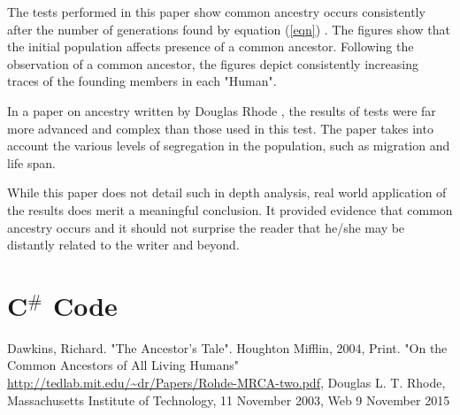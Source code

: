\documentclass[12pt]{extarticle}
\begin{document}
The tests performed in this paper show common ancestry occurs consistently after the number of generations found by equation (\ref{eqn}) . The figures show that the initial population affects presence of a common ancestor. Following the observation of a common ancestor, the figures depict consistently increasing traces of the founding members in each "Human".

In a paper on ancestry written by Douglas Rhode \cite{Population}, the results of tests were far more advanced and complex than those used in this test. The paper takes into account the various levels of segregation in the population, such as migration and life span.

While this paper does not detail such in depth analysis, real world application of the results does merit a meaningful conclusion. It provided evidence that common ancestry occurs and it should not surprise the reader that he/she may be distantly related to the writer and beyond.




\newpage

\lstset{basicstyle=\footnotesize,breaklines=true}
\lstset{framextopmargin=50pt,frame=bottomline}

\section{C$^{\#}$ Code}

\newpage
\begin{thebibliography}{99}
Dawkins, Richard. "The Ancestor's Tale". Houghton Mifflin, 2004, Print.
"On the Common Ancestors of All Living Humans" \url{http://tedlab.mit.edu/~dr/Papers/Rohde-MRCA-two.pdf}, Douglas L. T. Rhode, Massachusetts Institute of Technology, 11 November 2003, Web 9 November 2015

\end{thebibliography}
\end{document}
